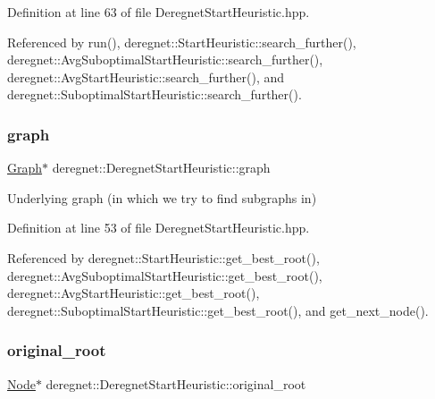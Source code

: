 Definition at line 63 of file Deregnet\+Start\+Heuristic.\+hpp.



Referenced by run(), deregnet\+::\+Start\+Heuristic\+::search\+\_\+further(), deregnet\+::\+Avg\+Suboptimal\+Start\+Heuristic\+::search\+\_\+further(), deregnet\+::\+Avg\+Start\+Heuristic\+::search\+\_\+further(), and deregnet\+::\+Suboptimal\+Start\+Heuristic\+::search\+\_\+further().

\mbox{\label{classderegnet_1_1DeregnetStartHeuristic_a4da8e53fc7c0fa3dbe0e3ef07296d75e}} 
\subsubsection{\texorpdfstring{graph}{graph}}
{\footnotesize\ttfamily \hyperlink{namespacederegnet_a55b76c55bbabc682cbc61f8b9948799e}{Graph}$\ast$ deregnet\+::\+Deregnet\+Start\+Heuristic\+::graph\hspace{0.3cm}{\ttfamily [protected]}}



Underlying graph (in which we try to find subgraphs in) 



Definition at line 53 of file Deregnet\+Start\+Heuristic.\+hpp.



Referenced by deregnet\+::\+Start\+Heuristic\+::get\+\_\+best\+\_\+root(), deregnet\+::\+Avg\+Suboptimal\+Start\+Heuristic\+::get\+\_\+best\+\_\+root(), deregnet\+::\+Avg\+Start\+Heuristic\+::get\+\_\+best\+\_\+root(), deregnet\+::\+Suboptimal\+Start\+Heuristic\+::get\+\_\+best\+\_\+root(), and get\+\_\+next\+\_\+node().

\mbox{\label{classderegnet_1_1DeregnetStartHeuristic_a22c9ec9b11605201c87dbac622d7618e}} 
\subsubsection{\texorpdfstring{original\+\_\+root}{original\_root}}
{\footnotesize\ttfamily \hyperlink{namespacederegnet_a744bad34f2de9856d36715a445f027f3}{Node}$\ast$ deregnet\+::\+Deregnet\+Start\+Heuristic\+::original\+\_\+root\hspace{0.3cm}{\ttfamily [protected]}}



